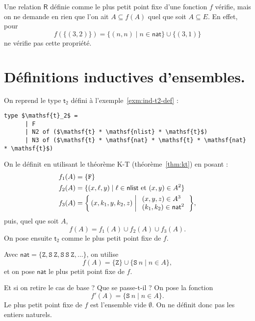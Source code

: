 \documentclass[../main]{subfiles}
\begin{document}
  \begin{rmk}
    Une relation $\mathsf{R}$ définie comme le plus petit point fixe d'une fonction $f$ vérifie, mais on ne demande en rien que l'on ait $A \subseteq f(A)$ quel que soit $A\subseteq E$. En effet, pour \[
    f(\{(3,2)\}) = \{(n,n)  \mid  n \in \mathsf{nat}\} \cup \{(3,1)\} 
    \] ne vérifie pas cette propriété.
  \end{rmk}

  \section{Définitions inductives d'ensembles.}

  \begin{exm}
    On reprend le type $\mathsf{t}_2$ défini à l'exemple~\ref{exm:ind-t2-def} :
    \begin{lstlisting}[language=caml,caption=Un exemple de type]
      type $\mathsf{t}_2$ =
      | F
      | N2 of ($\mathsf{t} * \mathsf{nlist} * \mathsf{t}$)
      | N3 of ($\mathsf{t} * \mathsf{nat} * \mathsf{t} * \mathsf{nat} * \mathsf{t}$)
    \end{lstlisting}
    On le définit en utilisant le théorème K-T (théorème~\ref{thm:kt}) en posant :
    \begin{align*}
      f_1(A) &= \{\mathtt{F}\} \\
      f_2(A) &= \{(x,\ell,y)  \mid  \ell \in \mathsf{nlist}\ \text{et}\ (x,y) \in A^2\} \\
      f_3(A) &= \mleft\{\,(x,k_1,y,k_2,z) \;\middle|\;
      \begin{array}{l}
        (x,y,z) \in A^3\\
        (k_1,k_2) \in \mathsf{nat}^2
      \end{array}\,\mright\}
    ,\end{align*}
    puis, quel que soit $A$, \[
      f(A) = f_1(A) \cup f_2(A) \cup f_3(A)
    .\]
    On pose ensuite $\mathsf{t}_2$ comme le plus petit point fixe de $f$.
  \end{exm}


  \begin{exm}
    Avec $\mathsf{nat} = \{ \mathtt{Z}, \mathtt{S}\ \mathtt{Z}, \mathtt{S}\ \mathtt{S}\ \mathtt{Z}, \ldots\}$, on utilise \[
      f(A) = \{\mathtt{Z}\} \cup \{ \mathtt{S}\ n  \mid n \in A \}
    ,\]
    et on pose $\mathsf{nat}$ le plus petit point fixe de $f$.

    Et si on retire le cas de base ? Que se passe-t-il ? On pose la fonction \[
    f'(A) = \{\mathtt{S}\ n  \mid n \in A\} 
    .\] Le plus petit point fixe de $f$ est l'ensemble vide $\emptyset$.
    On ne définit donc pas les entiers naturels.
  \end{exm}
\end{document}
